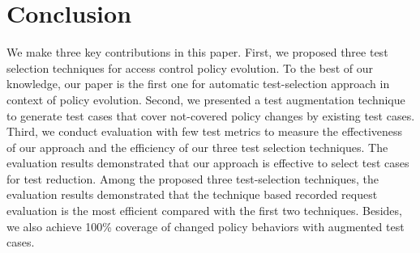 \section{Conclusion}
\label{sec:conclusion}

We make three key contributions in this paper. First, we proposed three test selection techniques for access control policy evolution. 
To the best of our knowledge, our paper is the first one for automatic test-selection approach in context of policy
evolution. Second, we presented a test augmentation technique to generate test cases that cover not-covered
policy changes by existing test cases. Third, we conduct evaluation with few test metrics to measure the effectiveness of our approach and the efficiency of our three test selection
techniques.
The evaluation results demonstrated that our approach is effective to select test cases for test reduction.
Among the proposed three test-selection techniques, the evaluation results demonstrated that the technique based recorded
request evaluation is the most efficient compared with the first two techniques. Besides, we also achieve 100\% coverage
of changed policy behaviors with augmented test cases.

%
%
%
%
%
%
